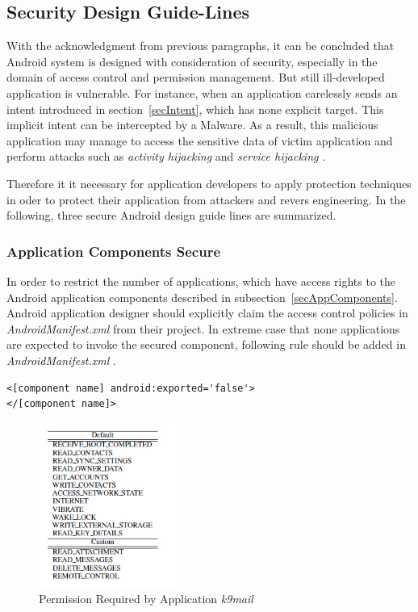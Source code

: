 \subsection{Security Design Guide-Lines}
With the acknowledgment from previous paragraphs, it can be concluded that Android system is designed with consideration of security, especially in the domain of access control and permission management. But still ill-developed application is vulnerable. For instance, when an application carelessly sends an intent introduced in section~\ref{secIntent}, which has none explicit target. This implicit intent can be intercepted by a Malware. As a result, this malicious application may manage to access the sensitive data of victim application and perform attacks such as \emph{activity hijacking} and \emph{service hijacking} \cite{android_secure_inter}.

Therefore it it necessary for application developers to apply protection techniques  in oder to protect their application from attackers and revers engineering. In the following, three secure Android design guide lines are summarized.

\subsubsection{Application Components Secure}
In order to restrict the number of applications, which have access rights to the Android application components described in subsection~\ref{secAppComponents}. Android application designer  should explicitly claim the access control policies in \emph{AndroidManifest.xml} from their project. In extreme case that none applications are expected to invoke the secured component, following rule should be added in \emph{AndroidManifest.xml} \cite{android_secure_cook}.
\begin{Verbatim}[fontsize=\relsize{-1},frame=lines,framesep=4mm, label=\fbox{\small\emph{Component Securing}}]
<[component name] android:exported='false'>
</[component name]>
\end{Verbatim} 

\begin{figure}[!htb]
	\centering
	\includegraphics[width=0.4\textwidth]{android-permission2.jpg}
		\caption{Permission Required by Application \emph{k9mail} \cite{android_secure_design}}
	\label{fig:android-permission2}
\end{figure}
